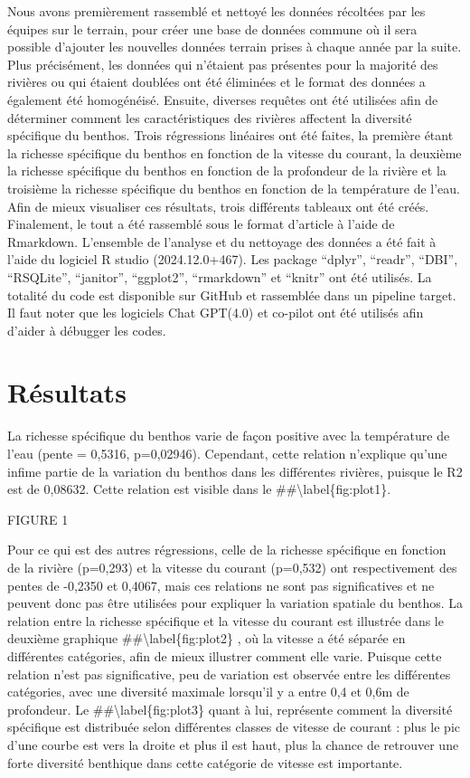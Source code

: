 \documentclass[9pt,twocolumn,twoside,]{pnas-new}
\begin{document}
Nous avons premièrement rassemblé et nettoyé les données récoltées par
les équipes sur le terrain, pour créer une base de données commune où il
sera possible d'ajouter les nouvelles données terrain prises à chaque
année par la suite. Plus précisément, les données qui n'étaient pas
présentes pour la majorité des rivières ou qui étaient doublées ont été
éliminées et le format des données a également été homogénéisé. Ensuite,
diverses requêtes ont été utilisées afin de déterminer comment les
caractéristiques des rivières affectent la diversité spécifique du
benthos. Trois régressions linéaires ont été faites, la première étant
la richesse spécifique du benthos en fonction de la vitesse du courant,
la deuxième la richesse spécifique du benthos en fonction de la
profondeur de la rivière et la troisième la richesse spécifique du
benthos en fonction de la température de l'eau. Afin de mieux visualiser
ces résultats, trois différents tableaux ont été créés. Finalement, le
tout a été rassemblé sous le format d'article à l'aide de Rmarkdown.
L'ensemble de l'analyse et du nettoyage des données a été fait à l'aide
du logiciel R studio (2024.12.0+467). Les package ``dplyr'', ``readr'',
``DBI'', ``RSQLite'', ``janitor'', ``ggplot2'', ``rmarkdown'' et
``knitr'' ont été utilisés. La totalité du code est disponible sur
GitHub et rassemblée dans un pipeline target. Il faut noter que les
logiciels Chat GPT(4.0) et co-pilot ont été utilisés afin d'aider à
débugger les codes.

\section{Résultats}\label{ruxe9sultats}

La richesse spécifique du benthos varie de façon positive avec la
température de l'eau (pente = 0,5316, p=0,02946). Cependant, cette
relation n'explique qu'une infime partie de la variation du benthos dans
les différentes rivières, puisque le R2 est de 0,08632. Cette relation
est visible dans le \#\#\textbackslash label\{fig:plot1\}.

FIGURE 1

Pour ce qui est des autres régressions, celle de la richesse spécifique
en fonction de la rivière (p=0,293) et la vitesse du courant (p=0,532)
ont respectivement des pentes de -0,2350 et 0,4067, mais ces relations
ne sont pas significatives et ne peuvent donc pas être utilisées pour
expliquer la variation spatiale du benthos. La relation entre la
richesse spécifique et la vitesse du courant est illustrée dans le
deuxième graphique \#\#\textbackslash label\{fig:plot2\} , où la vitesse
a été séparée en différentes catégories, afin de mieux illustrer comment
elle varie. Puisque cette relation n'est pas significative, peu de
variation est observée entre les différentes catégories, avec une
diversité maximale lorsqu'il y a entre 0,4 et 0,6m de profondeur. Le
\#\#\textbackslash label\{fig:plot3\} quant à lui, représente comment la
diversité spécifique est distribuée selon différentes classes de vitesse
de courant : plus le pic d'une courbe est vers la droite et plus il est
haut, plus la chance de retrouver une forte diversité benthique dans
cette catégorie de vitesse est importante.
\end{document}

